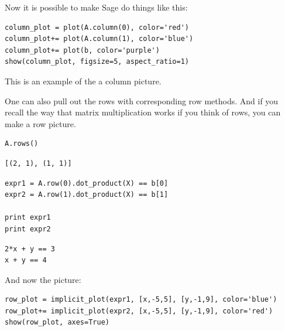 \documentclass[10pt,]{book}
\theoremstyle{plain}
\numberwithin{equation}{section}
\begin{document}
      Now it is possible to make Sage do things like this:
\begin{lstlisting}[style=sageinput]
column_plot = plot(A.column(0), color='red')
column_plot+= plot(A.column(1), color='blue')
column_plot+= plot(b, color='purple')
show(column_plot, figsize=5, aspect_ratio=1)
\end{lstlisting}
\par

      This is an example of the a column picture.
\par

      One can also pull out the rows with corresponding row methods. And if you
      recall the way that matrix multiplication works if you think of rows, you
      can make a row picture.
\begin{lstlisting}[style=sageinput]
A.rows()
\end{lstlisting}
\begin{lstlisting}[style=sageoutput]
[(2, 1), (1, 1)]
\end{lstlisting}
\begin{lstlisting}[style=sageinput]
expr1 = A.row(0).dot_product(X) == b[0]
expr2 = A.row(1).dot_product(X) == b[1]

print expr1
print expr2
\end{lstlisting}
\begin{lstlisting}[style=sageoutput]
2*x + y == 3
x + y == 4
\end{lstlisting}
\par

      And now the picture:
\begin{lstlisting}[style=sageinput]
row_plot = implicit_plot(expr1, [x,-5,5], [y,-1,9], color='blue')
row_plot+= implicit_plot(expr2, [x,-5,5], [y,-1,9], color='red')
show(row_plot, axes=True)
\end{lstlisting}
\typeout{************************************************}
\typeout{************************************************}
\end{document}
